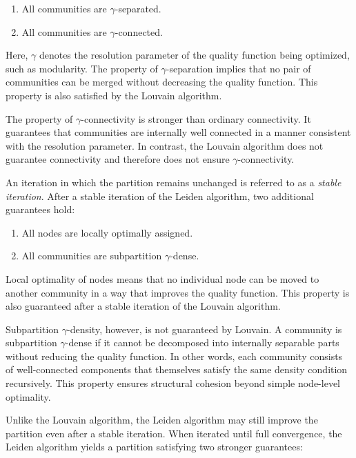 \begin{enumerate}
    \item All communities are $\gamma$-separated.
    \item All communities are $\gamma$-connected.
\end{enumerate}

Here, $\gamma$ denotes the resolution parameter of the quality function 
being optimized, such as modularity. 
The property of $\gamma$-separation implies that no pair of communities 
can be merged without decreasing the quality function. This property is 
also satisfied by the Louvain algorithm. 

The property of $\gamma$-connectivity is stronger than ordinary connectivity. 
It guarantees that communities are internally well connected in a manner 
consistent with the resolution parameter. In contrast, the Louvain algorithm 
does not guarantee connectivity and therefore does not ensure $\gamma$-connectivity.

An iteration in which the partition remains unchanged is referred to as a 
\emph{stable iteration}. After a stable iteration of the Leiden algorithm, 
two additional guarantees hold:

\begin{enumerate}
    \item All nodes are locally optimally assigned.
    \item All communities are subpartition $\gamma$-dense.
\end{enumerate}

Local optimality of nodes means that no individual node can be moved to 
another community in a way that improves the quality function. This 
property is also guaranteed after a stable iteration of the Louvain algorithm.

Subpartition $\gamma$-density, however, is not guaranteed by Louvain. 
A community is subpartition $\gamma$-dense if it cannot be decomposed 
into internally separable parts without reducing the quality function. 
In other words, each community consists of well-connected components 
that themselves satisfy the same density condition recursively. 
This property ensures structural cohesion beyond simple node-level optimality.

Unlike the Louvain algorithm, the Leiden algorithm may still improve 
the partition even after a stable iteration. When iterated until full 
convergence, the Leiden algorithm yields a partition satisfying two 
stronger guarantees:

